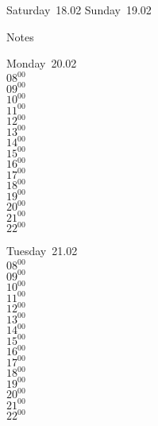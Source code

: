 \documentclass[11pt,a4paper]{book}\usepackage[]{graphicx}\usepackage[]{color}
\begin{document}
\begin{weekendbox}
  Saturday~18.02
  \tcblower
  Sunday~19.02
\end{weekendbox} %
\begin{notebox}
  Notes
\end{notebox}
\clearpage
\begin{headerbox}
\end{headerbox}
\begin{weekdaybox}
  Monday~20.02\\
  { 
  \vfill
  $08^{00}$\\
$09^{00}$\\
$10^{00}$\\
$11^{00}$\\
$12^{00}$\\
$13^{00}$\\
$14^{00}$\\
$15^{00}$\\
$16^{00}$\\
$17^{00}$\\
$18^{00}$\\
$19^{00}$\\
$20^{00}$\\
$21^{00}$\\
$22^{00}$\\
  }
\end{weekdaybox}
\begin{weekdaybox}
  Tuesday~21.02\\
  { 
  \vfill
  $08^{00}$\\
$09^{00}$\\
$10^{00}$\\
$11^{00}$\\
$12^{00}$\\
$13^{00}$\\
$14^{00}$\\
$15^{00}$\\
$16^{00}$\\
$17^{00}$\\
$18^{00}$\\
$19^{00}$\\
$20^{00}$\\
$21^{00}$\\
$22^{00}$\\
  }
\end{weekdaybox}
\end{document}
